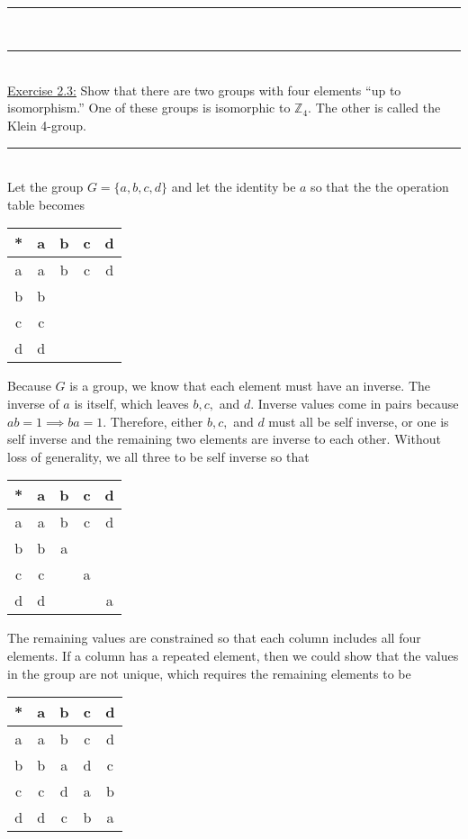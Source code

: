 \documentclass{article}
\newcommand{\problemsep}{\leavevmode\\[0.05in] \rule[\baselineskip/4]{\textwidth}{1pt} \\[0.005in] \rule[\baselineskip]{\textwidth}{1pt}\vspace{-\baselineskip}\leavevmode\\[0.05in]}
\newcommand{\statementsep}{\leavevmode\\[0.005in] \rule[\baselineskip/4]{\textwidth}{0.4pt}\leavevmode\\[0.005in]}
\begin{document}
\problemsep
\noindent\underline{Exercise 2.3:} Show that there are two groups with four elements ``up to isomorphism.'' One of these groups is isomorphic to $\mathbb{Z}_4$. The other is called the Klein 4-group.  
\statementsep
Let the group $G = \{ a, b, c, d\} $ and let the identity be $a$ so that the the operation table becomes
\begin{center}
	\begin{tabular}{c | c c c c}
	* & a & b & c & d \\ \hline
  a & a & b & c & d \\ 
  b & b &   &   &   \\
  c & c &   &   &   \\
  d & d &   &   &   \\
\end{tabular}
\end{center}
Because $G$ is a group, we know that each element must have an inverse. The inverse of $a$ is itself, which leaves $b, c,$ and $d$. Inverse values come in pairs because $ab = 1 \implies ba = 1$. Therefore, either $b, c,$ and $d$ must all be self inverse, or one is self inverse and the remaining two elements are inverse to each other. Without loss of generality, we all three to be self inverse so that
\begin{center}
	\begin{tabular}{c | c c c c}
	* & a & b & c & d \\ \hline
  a & a & b & c & d \\ 
  b & b & a &   &   \\
  c & c &   & a &   \\
  d & d &   &   & a \\
\end{tabular}
\end{center} 
The remaining values are constrained so that each column includes all four elements. If a column has a repeated element, then we could show that the values in the group are not unique, which requires the remaining elements to be
\begin{center}
	\begin{tabular}{c | c c c c}
	* & a & b & c & d \\ \hline
  a & a & b & c & d \\ 
  b & b & a & d & c \\
  c & c & d & a & b \\
  d & d & c & b & a \\
\end{tabular}
\end{center} 
\end{document}
